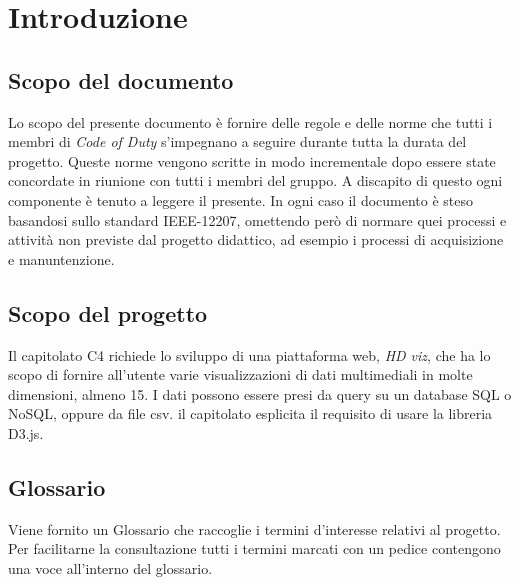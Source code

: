 \section{Introduzione}
    \subsection{Scopo del documento}
    Lo scopo del presente documento è fornire delle regole e delle norme che tutti i membri di \textit{Code of Duty} s'impegnano a seguire durante tutta la durata del progetto. Queste norme vengono scritte in modo incrementale dopo essere state concordate in riunione con tutti i membri del gruppo.
    A discapito di questo ogni componente è tenuto a leggere il presente.
    In ogni caso il documento è steso basandosi sullo standard IEEE-12207, omettendo però di normare quei processi e attività non previste dal progetto didattico, ad esempio i processi di acquisizione e manuntenzione. 
    \subsection{Scopo del progetto}
    Il capitolato C4 richiede lo sviluppo di una piattaforma web, \textit{HD viz}, che ha lo scopo di fornire all'utente varie visualizzazioni di dati multimediali in molte dimensioni, almeno 15. I dati possono essere presi da query su un database SQL o NoSQL, oppure da file csv. il capitolato esplicita il requisito di usare la libreria D3.js.
    \subsection{Glossario}
    Viene fornito un Glossario che raccoglie i termini d'interesse relativi al progetto. Per facilitarne la consultazione tutti i termini marcati con un pedice \glo{} contengono una voce all'interno del glossario.
